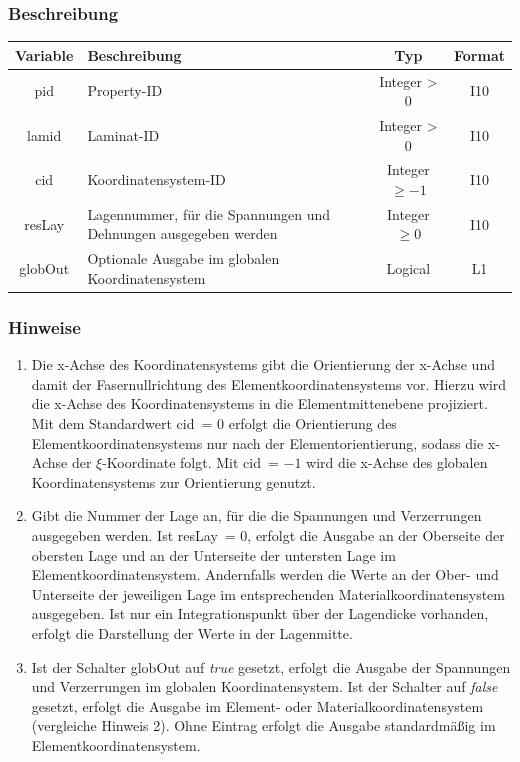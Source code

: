 \documentclass[11pt,titlepage,listof=totoc,bibliography=totoc,twoside]{scrreprt}
\begin{document}
{{\subsubsection{Beschreibung}

\begin{tabularx}{\textwidth}{cXcc}
\toprule
Variable  & Beschreibung  & Typ          & Format  \\
\midrule
pid       & Property-ID   & Integer > 0  & I10     \\
lamid     & Laminat-ID    & Integer > 0  & I10     \\
cid       & Koordinatensystem-ID  & Integer $\geq -1$  & I10     \\
resLay    & Lagennummer, für die Spannungen und Dehnungen ausgegeben werden & Integer $\geq 0$ & I10 \\
globOut   & Optionale Ausgabe im globalen Koordinatensystem & Logical & L1 \\
\bottomrule
\end{tabularx}

\subsubsection{Hinweise}

\begin{enumerate}
 \item Die x-Achse des Koordinatensystems gibt die Orientierung der x-Achse und damit der Fasernullrichtung des Elementkoordinatensystems vor. Hierzu wird die x-Achse des Koordinatensystems in die Elementmittenebene projiziert. Mit dem Standardwert cid~= 0 erfolgt die Orientierung des Elementkoordinatensystems nur nach der Elementorientierung, sodass die x-Achse der $\xi$-Koordinate folgt. Mit cid~= $-1$ wird die x-Achse des globalen Koordinatensystems zur Orientierung genutzt.
 \item Gibt die Nummer der Lage an, für die die Spannungen und Verzerrungen ausgegeben werden. Ist resLay~= 0, erfolgt die Ausgabe an der Oberseite der obersten Lage und an der Unterseite der untersten Lage im Elementkoordinatensystem. Andernfalls werden die Werte an der Ober- und Unterseite der jeweiligen Lage im entsprechenden Materialkoordinatensystem ausgegeben. Ist nur ein Integrationspunkt über der Lagendicke vorhanden, erfolgt die Darstellung der Werte in der Lagenmitte.
 \item Ist der Schalter globOut auf \textit{true} gesetzt, erfolgt die Ausgabe der Spannungen und Verzerrungen im globalen Koordinatensystem. Ist der Schalter auf \textit{false} gesetzt, erfolgt die Ausgabe im Element- oder Materialkoordinatensystem (vergleiche Hinweis 2). Ohne Eintrag erfolgt die Ausgabe standardmäßig im Elementkoordinatensystem.
\end{enumerate}

}}
\end{document}
